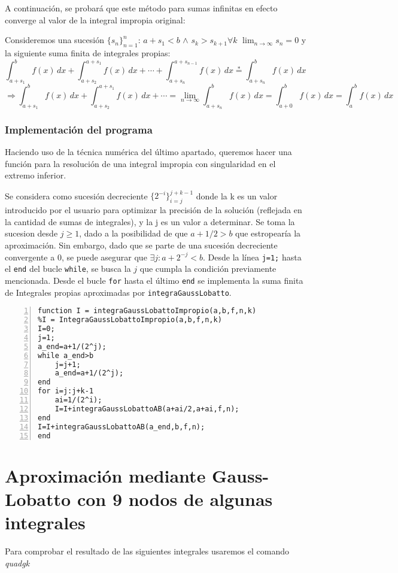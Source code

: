 \documentclass[a4paper]{article}
\begin{document}
A continuación, se probará que este método para sumas infinitas en efecto converge al valor de la integral impropia original:

Consideremos una sucesión $\{s_n\}_{n=1}^n$: $a+s_1<b$ $\wedge$ \stackrel{*} $s_k > s_{k+1} \forall k$ \in{}$ $\wedge $ \lim_{n \rightarrow \infty} s_n = 0$
y la siguiente suma finita de integrales propias:
$$
\int_{a + s_1}^b f(x) \, dx + \int_{a + s_{2}}^{a + s_1} f(x) \, dx + \cdots + \int_{a + s_n}^{a + s_{n-1}} f(x) \, dx \stackrel{*}= \int_{a+s_n}^b f(x) \, dx \quad $$
$$\Rightarrow \int_{a + s_1}^b f(x) \, dx + \int_{a + s_2}^{a + s_1} f(x) \, dx + \cdots = \lim_{n \rightarrow \infty} \int_{a + s_n}^b f(x) \, dx = \int_{a + 0}^b f(x) \, dx = \int_a^b f(x) \, dx$$

\subsubsection{Implementación del programa}

Haciendo uso de la técnica numérica del último apartado, queremos hacer una función para la resolución de una integral impropia con singularidad en el extremo inferior.

Se considera como sucesión decreciente $\{2^{-i}\}_{i=j}^{j+k-1}$ donde la k es un valor introducido por el usuario para optimizar la precisión de la solución (reflejada en la cantidad de sumas de integrales), y la j es un valor a determinar. Se toma la sucesion desde $j\geq 1$, dado a la posibilidad de que $a+1/2>b$ que estropearía la aproximación. Sin embargo, dado que se parte de una sucesión decreciente convergente a 0, se puede asegurar que $\exists j:a+2^{-j}<b$. Desde la línea \texttt{j=1;} hasta el \texttt{end} del bucle \texttt{while}, se busca la $j$ que cumpla la condición previamente mencionada. Desde el bucle \texttt{for} hasta el último \texttt{end} se implementa la suma finita de Integrales propias aproximadas por \texttt{integraGaussLobatto}.

 
\begin{lstlisting}[frame=single, numbers=left, style=Matlab-Pyglike]
function I = integraGaussLobattoImpropio(a,b,f,n,k)
%I = IntegraGaussLobattoImpropio(a,b,f,n,k)
I=0;
j=1;
a_end=a+1/(2^j);
while a_end>b
    j=j+1;
    a_end=a+1/(2^j);
end
for i=j:j+k-1
    ai=1/(2^i);
    I=I+integraGaussLobattoAB(a+ai/2,a+ai,f,n);
end
I=I+integraGaussLobattoAB(a_end,b,f,n);
end
\end{lstlisting}

\section{Aproximación mediante Gauss-Lobatto con 9 nodos de algunas integrales}
Para comprobar el resultado de las siguientes integrales usaremos el comando \textit{quadgk}
\end{document}
